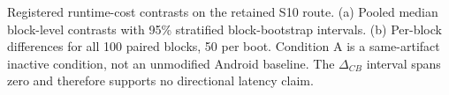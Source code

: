 \caption{Registered runtime-cost contrasts on the retained S10 route. (a) Pooled median block-level contrasts with 95\% stratified block-bootstrap intervals. (b) Per-block differences for all 100 paired blocks, 50 per boot. Condition A is a same-artifact inactive condition, not an unmodified Android baseline. The $\Delta_{CB}$ interval spans zero and therefore supports no directional latency claim.}
